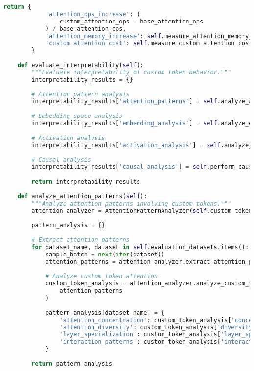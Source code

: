 \begin{lstlisting}[language=Python, caption=Comprehensive evaluation framework for custom tokens]
        return {
            'attention_ops_increase': (
                custom_attention_ops - base_attention_ops
            ) / base_attention_ops,
            'attention_memory_increase': self.measure_attention_memory_increase(),
            'custom_attention_cost': self.measure_custom_attention_cost()
        }
    
    def evaluate_interpretability(self):
        """Evaluate interpretability of custom token behavior."""
        interpretability_results = {}
        
        # Attention pattern analysis
        interpretability_results['attention_patterns'] = self.analyze_attention_patterns()
        
        # Embedding space analysis
        interpretability_results['embedding_analysis'] = self.analyze_embedding_space()
        
        # Activation analysis
        interpretability_results['activation_analysis'] = self.analyze_activations()
        
        # Causal analysis
        interpretability_results['causal_analysis'] = self.perform_causal_analysis()
        
        return interpretability_results
    
    def analyze_attention_patterns(self):
        """Analyze attention patterns involving custom tokens."""
        attention_analyzer = AttentionPatternAnalyzer(self.custom_token_model)
        
        pattern_analysis = {}
        
        # Extract attention patterns
        for dataset_name, dataset in self.evaluation_datasets.items():
            sample_batch = next(iter(dataset))
            attention_patterns = attention_analyzer.extract_attention_patterns(sample_batch)
            
            # Analyze custom token attention
            custom_token_analysis = attention_analyzer.analyze_custom_token_attention(
                attention_patterns
            )
            
            pattern_analysis[dataset_name] = {
                'attention_concentration': custom_token_analysis['concentration'],
                'attention_diversity': custom_token_analysis['diversity'],
                'layer_specialization': custom_token_analysis['layer_specialization'],
                'interaction_patterns': custom_token_analysis['interactions']
            }
        
        return pattern_analysis
    

\end{lstlisting}
